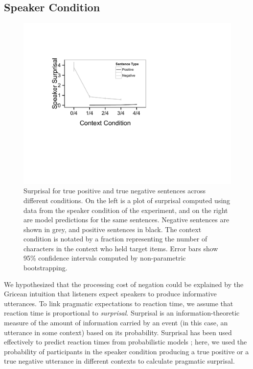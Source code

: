 \documentclass[man]{apa2}
\begin{document}
\subsection{Speaker Condition}

\begin{figure}[t]
\begin{center} 
\includegraphics[width=6in]{figures/surprisals.pdf}
\caption{\label{fig:e2line} Surprisal for true positive and true negative sentences across different conditions. On the left is a plot of surprisal computed using data from the speaker condition of the experiment, and on the right are model predictions for the same sentences.  Negative sentences are shown in grey, and positive sentences in black.  The context condition is notated by a fraction representing the number of characters in the context who held target items. Error bars show 95\% confidence intervals computed by non-parametric bootstrapping.  }
\end{center} 
\end{figure}

We hypothesized that the processing cost of negation could be explained by the Gricean intuition that listeners expect speakers to produce informative utterances.  To link pragmatic expectations to reaction time, we assume that reaction time is proportional to \emph{surprisal}. Surprisal is an information-theoretic measure of the amount of information carried by an event (in this case, an utterance in some context) based on its probability. Surprisal has been used effectively to predict reaction times from probabilistic models \cite{levy2008}; here, we used the probability of participants in the speaker condition producing a true positive or a true negative utterance in different contexts to calculate pragmatic surprisal.
\end{document}
